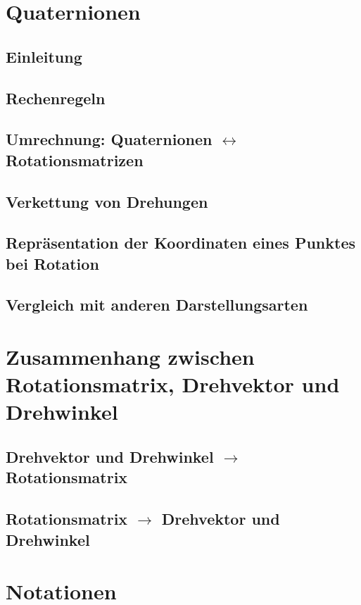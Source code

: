 \documentclass[a4paper, 11pt, accentcolor = tud3b]{tudreport}
\begin{document}
	\appendix

	\chapter{Quaternionen} %

		\section{Einleitung} %

		\section{Rechenregeln} %

		\section{Umrechnung: Quaternionen \(\leftrightarrow\) Rotationsmatrizen} %

		\section{Verkettung von Drehungen} %

		\section{Repräsentation der Koordinaten eines Punktes bei Rotation} %

		\section{Vergleich mit anderen Darstellungsarten} %

	\chapter{Zusammenhang zwischen Rotationsmatrix, Drehvektor und Drehwinkel} %

		\section{Drehvektor und Drehwinkel \(\to\) Rotationsmatrix} %

		\section{Rotationsmatrix \(\to\) Drehvektor und Drehwinkel} %

	\chapter{Notationen} %
\end{document}
